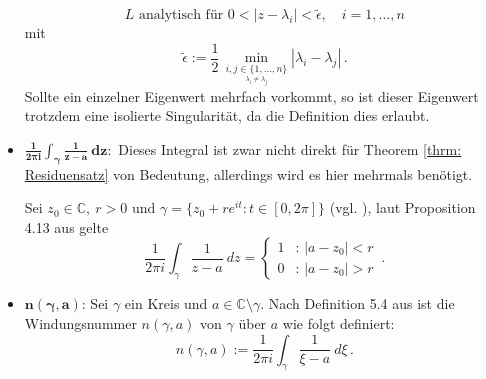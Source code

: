 \documentclass[a4paper,12pt]{report}
\newcommand{\C}{\mathbb C}
\newcommand{\1}{\mathds{1}}
\theoremstyle{plain} %
\theoremstyle{definition} %
\theoremstyle{remark}
\begin{document}
\begin{itemize}
                        \begin{equation}
                              \label{hilfe: complexAnalysis_isolierteSingularitäten}
                              L \text{ analytisch für } 0<|z-\lambda_i|<\widetilde{\epsilon},\quad i=1,\dots,n
                        \end{equation}
                        mit
                        $$\widetilde{\epsilon}:= \frac{1}{2}\,\min_{\underset{\lambda_i\ne \lambda_j}{i,j\in \{1,\dots,n\}} } |\lambda_i-\lambda_j|\,.$$
                        Sollte ein einzelner Eigenwert mehrfach vorkommt, so ist dieser Eigenwert trotzdem eine isolierte Singularität,
                        da die Definition dies erlaubt.
                  \item $\mathbf{\frac{1}{2\pi i}\int_{\gamma} \frac 1 {z-a}\ dz:}$
                        Dieses Integral ist zwar nicht direkt für Theorem \ref{thrm: Residuensatz} von Bedeutung, allerdings wird es hier mehrmals benötigt.

                        Sei $z_0\in\C,\ r>0\text{ und }\gamma=\{z_0+r e^{it}: t\in [0,2\pi]\}$ (vgl. \cite[S. 48]{complexAnalysis}),
                        laut Proposition 4.13 aus \cite[S. 48]{complexAnalysis} gelte
                        \begin{equation}
                              \label{hilfe: complexAnalysis_IntegralEinsDurchX}
                              \frac{1}{2\pi i}\int_\gamma \frac 1 {z-a}\ dz = \begin{cases}
                                    1 & \text{: } |a-z_0|<r \\
                                    0 & \text{: } |a-z_0|>r
                                    \end{cases}\,.
                        \end{equation}
                  \item $\mathbf{n(\gamma, a)}$:
                        Sei $\gamma$ ein Kreis und $a\in \C\setminus \gamma$.
                        Nach Definition 5.4 aus \cite[S. 65]{complexAnalysis} ist die Windungsnummer $n(\gamma,a)$ von $\gamma$ über $a$ wie folgt definiert:
                        $$n(\gamma,a):= \frac{1}{2\pi i}\int_\gamma \frac{1}{\xi-a}\ d\xi\,.$$


\end{itemize}
\end{document}
